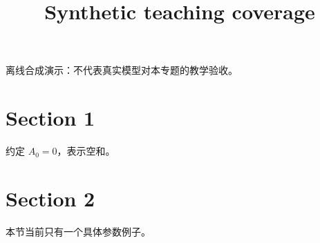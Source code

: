 \documentclass[UTF8,fontset=fandol,11pt]{ctexart}
\title{Synthetic teaching coverage}
\date{}
\begin{document}
\maketitle
\par\noindent 离线合成演示：不代表真实模型对本专题的教学验收。\par
\section{Section 1}\label{sec:S01}
约定 $A_0=0$，表示空和。\par
\section{Section 2}\label{sec:S02}
本节当前只有一个具体参数例子。\par
\end{document}
